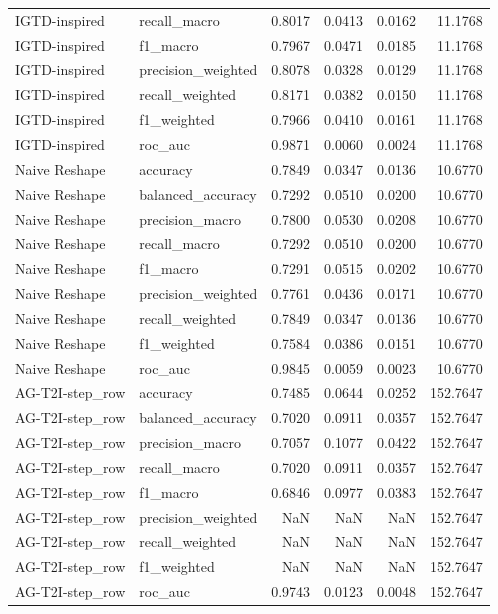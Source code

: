 \begin{tabular}{llrrrr}
IGTD-inspired & recall_macro & 0.8017 & 0.0413 & 0.0162 & 11.1768 \\
IGTD-inspired & f1_macro & 0.7967 & 0.0471 & 0.0185 & 11.1768 \\
IGTD-inspired & precision_weighted & 0.8078 & 0.0328 & 0.0129 & 11.1768 \\
IGTD-inspired & recall_weighted & 0.8171 & 0.0382 & 0.0150 & 11.1768 \\
IGTD-inspired & f1_weighted & 0.7966 & 0.0410 & 0.0161 & 11.1768 \\
IGTD-inspired & roc_auc & 0.9871 & 0.0060 & 0.0024 & 11.1768 \\
Naive Reshape & accuracy & 0.7849 & 0.0347 & 0.0136 & 10.6770 \\
Naive Reshape & balanced_accuracy & 0.7292 & 0.0510 & 0.0200 & 10.6770 \\
Naive Reshape & precision_macro & 0.7800 & 0.0530 & 0.0208 & 10.6770 \\
Naive Reshape & recall_macro & 0.7292 & 0.0510 & 0.0200 & 10.6770 \\
Naive Reshape & f1_macro & 0.7291 & 0.0515 & 0.0202 & 10.6770 \\
Naive Reshape & precision_weighted & 0.7761 & 0.0436 & 0.0171 & 10.6770 \\
Naive Reshape & recall_weighted & 0.7849 & 0.0347 & 0.0136 & 10.6770 \\
Naive Reshape & f1_weighted & 0.7584 & 0.0386 & 0.0151 & 10.6770 \\
Naive Reshape & roc_auc & 0.9845 & 0.0059 & 0.0023 & 10.6770 \\
AG-T2I-step_row & accuracy & 0.7485 & 0.0644 & 0.0252 & 152.7647 \\
AG-T2I-step_row & balanced_accuracy & 0.7020 & 0.0911 & 0.0357 & 152.7647 \\
AG-T2I-step_row & precision_macro & 0.7057 & 0.1077 & 0.0422 & 152.7647 \\
AG-T2I-step_row & recall_macro & 0.7020 & 0.0911 & 0.0357 & 152.7647 \\
AG-T2I-step_row & f1_macro & 0.6846 & 0.0977 & 0.0383 & 152.7647 \\
AG-T2I-step_row & precision_weighted & NaN & NaN & NaN & 152.7647 \\
AG-T2I-step_row & recall_weighted & NaN & NaN & NaN & 152.7647 \\
AG-T2I-step_row & f1_weighted & NaN & NaN & NaN & 152.7647 \\
AG-T2I-step_row & roc_auc & 0.9743 & 0.0123 & 0.0048 & 152.7647 \\

\end{tabular}
